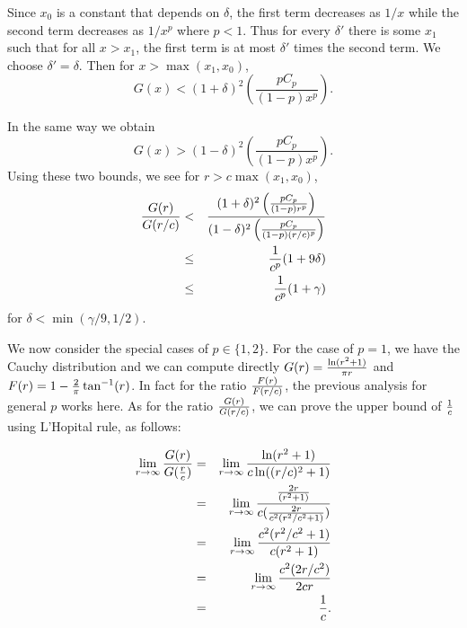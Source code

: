 \documentclass[12pt]{article}
\begin{document}
\noindent
Since $x_0$ is a constant that depends on $\delta$, the first term
decreases as $1/x$ while the second term decreases as $1/x^p$ where $p<1$.
Thus for every $\delta'$ there is some $x_1$ such that for all $x>x_1$,
the first term is at most $\delta'$ times the second term.  We
choose $\delta'=\delta$. Then for $x>\max(x_1,x_0)$,
$$G(x)<(1+\delta)^2\left(\frac{pC_p}{(1-p)x^p}\right).$$

In the same way we obtain
$$G(x)>(1-\delta)^2\left(\frac{pC_p}{(1-p)x^p}\right).$$
Using these two bounds, we see for $r>c\max(x_1,x_0)$,
\begin{eqnarray*}
\frac{G(r)}{G(r/c)} &<&
\frac{(1+\delta)^2\left(\frac{pC_p}{(1-p)r^p}\right)}
     {(1-\delta)^2\left(\frac{pC_p}{(1-p)(r/c)^p}\right)}
\cr&\leq& \frac{1}{c^p}(1+9\delta) \cr&\leq&
\frac{1}{c^p}(1+\gamma)
\end{eqnarray*}
for $\delta<\min(\gamma/9,1/2)$.

We now consider the special cases of $p \in \{1,2\}$.
For the case of $p=1$, we have the Cauchy distribution and we can
compute directly $G(r)={\ln (r^2+1)\over \pi r}$ and $F(r)=1-{2\over
\pi}\tan^{-1} (r)$.
In fact for the ratio $F(r)\over F(r/c)$, the previous analysis for
general $p$ works here.  As for the ratio
${G(r)\over G(r/c)}$, we can prove the upper bound of $1\over c$ using
L'Hopital rule, as follows:

\begin{eqnarray*}
\lim_{r\rightarrow \infty}{G(r)\over G({r\over c})} 
&=& 
\lim_{r\rightarrow \infty}{\ln(r^2+1)\over c\ln((r/c)^2+1)} 
\cr&=& 
\lim_{r\rightarrow \infty}{{2r\over (r^2+1)}\over c({2r\over c^2(r^2/c^2
+1)})}
\cr&=& 
\lim_{r\rightarrow \infty}{c^2(r^2/c^2+1)\over c(r^2+1)} 
\cr&=& 
\lim_{r\rightarrow \infty}{c^2(2r/c^2)\over 2cr} 
\cr&=& {1\over c}.
\end{eqnarray*}
\end{document}
